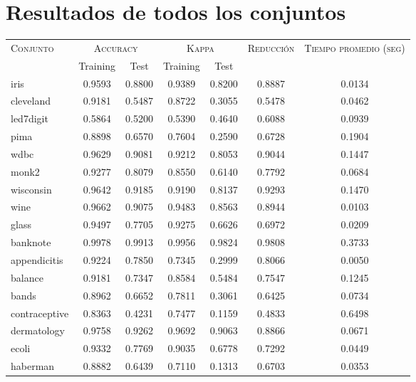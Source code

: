 \chapter{Resultados de todos los conjuntos}
\label{Apéndices}


\begin{table}[]
\centering
\begin{tabular}{l c c c c c c}
\hline
\multirow{2}{*}{\textsc{Conjunto}}
	& \multicolumn{2}{c}{\textsc{Accuracy}}
	& \multicolumn{2}{c}{\textsc{Kappa}}
	& \textsc{Reducción}
	& \textsc{Tiempo promedio (seg)} \\
	& Training & Test
	& Training & Test \\ 
\hline
\hline

iris & 0.9593 & 0.8800 & 0.9389 & 0.8200 & 0.8887 & 0.0134 \\
cleveland & 0.9181 & 0.5487 & 0.8722 & 0.3055 & 0.5478 & 0.0462 \\
led7digit & 0.5864 & 0.5200 & 0.5390 & 0.4640 & 0.6088 & 0.0939 \\
pima & 0.8898 & 0.6570 & 0.7604 & 0.2590 & 0.6728 & 0.1904 \\
wdbc & 0.9629 & 0.9081 & 0.9212 & 0.8053 & 0.9044 & 0.1447 \\
monk2 & 0.9277 & 0.8079 & 0.8550 & 0.6140 & 0.7792 & 0.0684 \\
wisconsin & 0.9642 & 0.9185 & 0.9190 & 0.8137 & 0.9293 & 0.1470 \\
wine & 0.9662 & 0.9075 & 0.9483 & 0.8563 & 0.8944 & 0.0103 \\
glass & 0.9497 & 0.7705 & 0.9275 & 0.6626 & 0.6972 & 0.0209 \\
banknote & 0.9978 & 0.9913 & 0.9956 & 0.9824 & 0.9808 & 0.3733 \\
appendicitis & 0.9224 & 0.7850 & 0.7345 & 0.2999 & 0.8066 & 0.0050 \\
balance & 0.9181 & 0.7347 & 0.8584 & 0.5484 & 0.7547 & 0.1245 \\
bands & 0.8962 & 0.6652 & 0.7811 & 0.3061 & 0.6425 & 0.0734 \\
contraceptive & 0.8363 & 0.4231 & 0.7477 & 0.1159 & 0.4833 & 0.6498 \\
dermatology & 0.9758 & 0.9262 & 0.9692 & 0.9063 & 0.8866 & 0.0671 \\
ecoli & 0.9332 & 0.7769 & 0.9035 & 0.6778 & 0.7292 & 0.0449 \\
haberman & 0.8882 & 0.6439 & 0.7110 & 0.1313 & 0.6703 & 0.0353 \\

\end{tabular}
\end{table}
